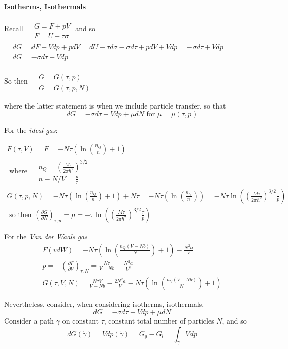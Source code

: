 \textbf{Isotherms, Isothermals}

Recall $\begin{aligned} 
  & \quad \\
  & G = F + pV \\
  & F = U-\tau \sigma \end{aligned}$ and so $\begin{aligned}
  & \quad \\
  & dG = dF + Vdp + pdV = dU - \tau d\sigma - \sigma d\tau + pdV + Vdp = -\sigma d\tau + Vdp \\
  & dG = -\sigma d\tau + Vdp \end{aligned}$

So then $\begin{aligned} & \quad \\
  & G = G(\tau, p) \\
  & G= G(\tau, p, N) \end{aligned}$ 

where the latter statement is when we include particle transfer, so that 
\[
dG = -\sigma d\tau + Vdp + \mu dN \text{ for } \mu = \mu(\tau,p)
\]

For the \emph{ideal gas}:

\[
\begin{gathered}
  F(\tau,V) = F= -N\tau \left( \ln{ \left( \frac{n_Q}{n} \right)} + 1 \right) \\ 
  \text{ where }  \begin{aligned}
    & n_Q = \left( \frac{M\tau }{2\pi \hbar^2 } \right)^{3/2} \\ 
    & n \equiv N/V = \frac{p}{\tau} 
  \end{aligned} \\
  G(\tau,p, N) = -N \tau ( \ln{ \left( \frac{n_Q}{n} \right) } + 1 ) + N \tau = - N\tau ( \ln{ \left( \frac{n_Q}{n} \right) } ) = -N\tau \ln{ \left( \left( \frac{M\tau}{2\pi \hbar^2 } \right)^{3/2} \frac{\tau}{p} \right) } \\
  \text{ so then }
\left( \frac{ \partial G}{ \partial N} \right)_{\tau,p} = \mu = -\tau \ln{ \left( \left( \frac{M\tau}{2\pi \hbar^2} \right)^{3/2} \frac{\tau}{p} \right) }
\end{gathered}
\]

For the \emph{Van der Waals gas}
\[
\begin{gathered}
  F(vdW) = -N\tau \left( \ln{ \left( \frac{n_Q (V-Nb)}{N} \right) }  + 1 \right) - \frac{N^2 a }{V} \\ 
  p = -\left( \frac{\partial F}{ \partial V} \right)_{\tau,N} = \frac{N\tau}{V-Nb} - \frac{N^2a}{V^2} \\
  G(\tau,V,N) = \frac{N\tau V}{ V-Nb} - \frac{2N^2 a}{V} - N\tau ( \ln{ \left( \frac{n_Q (V-Nb)}{N} \right) } + 1 )
\end{gathered}
\]

Nevertheless, consider, when considering isotherms, isothermals, 
\[
dG = -\sigma d\tau  + Vdp + \mu dN
\]
Consider a path $\gamma$ on constant $\tau$, constant total number of particles $N$, and so
\[
dG(\dot{\gamma}) = Vdp(\dot{\gamma}) = G_g-G_l = \int_{\gamma} Vdp
\]


